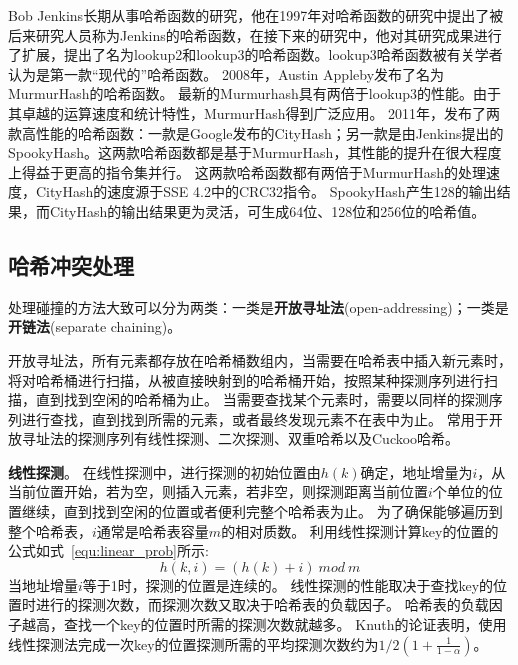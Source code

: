 Bob Jenkins长期从事哈希函数的研究，他在1997年对哈希函数的研究中提出了被后来研究人员称为Jenkins的哈希函数\cite{jenkins1997hash}，在接下来的研究中，他对其研究成果进行了扩展，提出了名为lookup2和lookup3的哈希函数\cite{jenkins2006function}。lookup3哈希函数被有关学者认为是第一款“现代的”哈希函数。
2008年，Austin Appleby发布了名为MurmurHash的哈希函数\cite{Murmurhash}。
最新的Murmurhash具有两倍于lookup3的性能。由于其卓越的运算速度和统计特性，MurmurHash得到广泛应用。
2011年，发布了两款高性能的哈希函数：一款是Google发布的CityHash\cite{cityhash}；另一款是由Jenkins提出的SpookyHash\cite{jenkins2012spookyhash}。这两款哈希函数都是基于MurmurHash，其性能的提升在很大程度上得益于更高的指令集并行。
这两款哈希函数都有两倍于MurmurHash的处理速度，CityHash的速度源于SSE 4.2中的CRC32指令。
SpookyHash产生128的输出结果，而CityHash的输出结果更为灵活，可生成64位、128位和256位的哈希值。

\subsection{哈希冲突处理}

处理碰撞的方法大致可以分为两类：一类是\textbf{开放寻址法}(open-addressing)；一类是\textbf{开链法}(separate chaining)。

开放寻址法，所有元素都存放在哈希桶数组内，当需要在哈希表中插入新元素时，将对哈希桶进行扫描，从被直接映射到的哈希桶开始，按照某种探测序列进行扫描，直到找到空闲的哈希桶为止。
当需要查找某个元素时，需要以同样的探测序列进行查找，直到找到所需的元素，或者最终发现元素不在表中为止。
常用于开放寻址法的探测序列有线性探测、二次探测、双重哈希以及Cuckoo哈希。

\textbf{线性探测}。
在线性探测中，进行探测的初始位置由$h(k)$确定，地址增量为$i$，从当前位置开始，若为空，则插入元素，若非空，则探测距离当前位置$i$个单位的位置继续，直到找到空闲的位置或者便利完整个哈希表为止。
为了确保能够遍历到整个哈希表，$i$通常是哈希表容量$m$的相对质数。
利用线性探测计算key的位置的公式如式~\ref{equ:linear_prob}所示:
\begin{equation}
	h(k,i) = (h(k)+i) ~{mod}~m
\label{equ:linear_prob}
\end{equation}
当地址增量$i$等于1时，探测的位置是连续的。
线性探测的性能取决于查找key的位置时进行的探测次数，而探测次数又取决于哈希表的负载因子。
哈希表的负载因子越高，查找一个key的位置时所需的探测次数就越多。
Knuth的论证表明\cite{knuth1998art}，使用线性探测法完成一次key的位置探测所需的平均探测次数约为$1/2(1+\frac{1}{1-\alpha})$。


